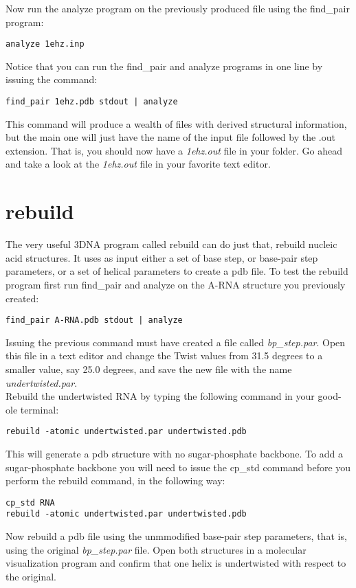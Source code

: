 \noindent Now run the analyze  program on the previously produced
file using the \textrm{find\_pair} program:
\begin{Verbatim}
analyze 1ehz.inp
\end{Verbatim}
Notice that  you can run the  \textrm{find\_pair} and \textrm{analyze}
programs in one line by issuing the command:
\begin{Verbatim}
find_pair 1ehz.pdb stdout | analyze
\end{Verbatim}
This command  will produce a  wealth of files with  derived structural
information, but  the main one  will just have  the name of  the input
file followed by  the .out extension.  That is, you  should now have a
\textit{1ehz.out} file in your folder. Go ahead and take a look at the
\textit{1ehz.out} file in your favorite text editor.

\section{rebuild}
The very useful 3DNA program called \textrm{rebuild} can do just that,
rebuild nucleic acid structures. It uses as input either a set of base
step, or base-pair step parameters,  or a set of helical parameters to
create  a   pdb  file.   To   test  the  rebuild  program   first  run
\textrm{find\_pair}  and \textrm{analyze} on  the A-RNA  structure you
previously created:
\begin{Verbatim}
find_pair A-RNA.pdb stdout | analyze
\end{Verbatim}
Issuing  the previous command must  have created  a file called
\textit{bp\_step.par}.
Open this file in a text editor and change the Twist values from 31.5 degrees
to a smaller value, say 25.0 degrees, and save the new file with the name
\textit{undertwisted.par}.\\
Rebuild the undertwisted RNA by typing the following command in your good-ole
terminal:
\begin{Verbatim}
rebuild -atomic undertwisted.par undertwisted.pdb
\end{Verbatim}
This   will  generate   a  pdb   structure  with   no  sugar-phosphate
backbone. To add a sugar-phosphate backbone you will need to issue the
\textrm{cp\_std}  command  before   you  perform  the  \textrm{rebuild}
command, in the following way:
\begin{Verbatim}
cp_std RNA
rebuild -atomic undertwisted.par undertwisted.pdb
\end{Verbatim} 
Now rebuild a  pdb file using the unmmodified base-pair
step  parameters, that  is, using  the  original \textit{bp\_step.par}
file. Open  both structures in  a molecular visualization  program and
confirm that one helix is undertwisted with respect to the original.


